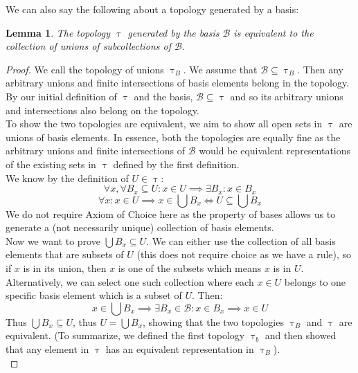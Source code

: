 \documentclass{article}
\newtheorem{lem}{Lemma}[section]
\begin{document}
\medskip
We can also say the following about a topology generated by a basis:
\begin{lem}
    The topology $\uptau$ generated by the basis $\mathcal{B}$ is equivalent to the collection of unions of subcollections of $\mathcal{B}$.
\end{lem}
\begin{proof}
We call the topology of unions $\uptau_B$. We assume that $\mathcal{B} \subseteq \uptau_B$. Then any arbitrary unions and finite intersections of basis elements belong in the topology. By our initial definition of $\uptau$ and the basis, $\mathcal{B} \subseteq \uptau$ and so its arbitrary unions and intersections also belong on the topology.\\
 
To show the two topologies are equivalent, we aim to show all open sets in $\uptau$ are unions of basis elements. In essence, both the topologies are equally fine as the arbitrary unions and finite intersections of $\mathcal{B}$ would be equivalent representations of the existing sets in $\uptau$ defined by the first definition.\\

We know by the definition of $U \in \uptau$:
\begin{equation*}
    \forall x, \forall B_x \subseteq U: x \in U \implies \exists B_x: x \in B_x
\end{equation*}
\begin{equation*}
    \forall x: x \in U \implies x \in \bigcup B_x \iff U \subseteq \bigcup B_x
\end{equation*}
We do not require Axiom of Choice here as the property of bases allows us to generate a (not necessarily unique) collection of basis elements.\\

Now we want to prove $\bigcup B_x \subseteq U$. We can either use the collection of all basis elements that are subsets of $U$ (this does not require choice as we have a rule), so if $x$ is in its union, then $x$ is one of the subsets which means $x$ is in $U$.\\

Alternatively, we can select one such collection where each $x \in U$ belongs to one specific basis element which is a subset of $U$. Then:
\begin{equation*}
    x \in \bigcup B_x \implies \exists B_x \in \mathcal{B}: x \in B_x \implies x \in U
\end{equation*}
Thus $\bigcup B_x \subseteq U$, thus $U = \bigcup B_x$, showing that the two topologies $\uptau_B$ and $\uptau$ are equivalent. (To summarize, we defined the first topology $\uptau_b$ and then showed that any element in $\uptau$ has an equivalent representation in $\uptau_B$).\\


\end{proof}
\end{document}
